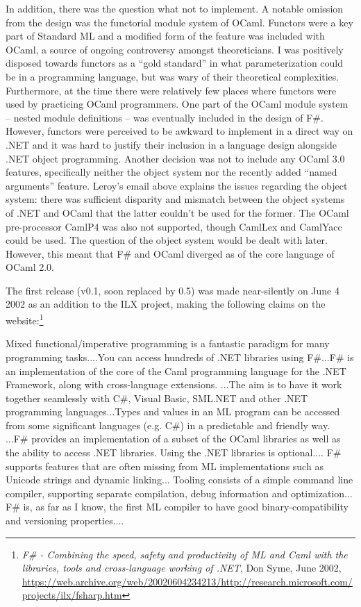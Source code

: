 \documentclass[acmsmall]{acmart}\settopmatter{}
\begin{document}
In addition, there was the question what not to implement.  A notable omission from the design was the functorial module system of OCaml.  Functors were a key part of Standard ML and a modified form of the feature was included with OCaml, a source of ongoing controversy amongst theoreticians.  I was positively disposed towards functors as a “gold standard” in what parameterization could be in a programming language, but was wary of their theoretical complexities. Furthermore, at the time there were relatively few places where functors were used by practicing OCaml programmers. One part of the OCaml module system – nested module definitions – was eventually included in the design of F\#.  However, functors were perceived to be awkward to implement in a direct way on .NET and it was hard to justify their inclusion in a language design alongside .NET object programming. Another decision was not to include any OCaml 3.0 features, specifically neither the object system nor the recently added “named arguments” feature.  Leroy’s email above explains the issues regarding the object system: there was sufficient disparity and mismatch between the object systems of .NET and OCaml that the latter couldn’t be used for the former.  The OCaml pre-processor CamlP4 was also not supported, though CamlLex and CamlYacc could be used. The question of the object system would be dealt with later.  However, this meant that F\# and OCaml diverged as of the core language of OCaml 2.0.


The first release (v0.1, soon replaced by 0.5) was made near-silently on June 4 2002 as an addition to the ILX project, making the following claims on the website:\footnote{\textit{F\# - Combining the speed, safety and productivity of ML and Caml with the libraries, tools and cross-language working of .NET}, Don Syme, June 2002, \url{https://web.archive.org/web/20020604234213/http://research.microsoft.com/projects/ilx/fsharp.htm}}
\begin{verbquote}
Mixed functional/imperative programming is a fantastic paradigm for many programming tasks....You can access hundreds of .NET libraries using F#...F# is an implementation of the core of the Caml programming language for the .NET Framework, along with cross-language extensions. ...The aim is to have it work together seamlessly with C#, Visual Basic, SML.NET and other .NET programming languages...Types and values in an ML program can be accessed from some significant languages (e.g. C#) in a predictable and friendly way. ...F# provides an implementation of a subset of the OCaml libraries as well as the ability to access .NET libraries.  Using the .NET libraries is optional.... F# supports features that are often missing from ML implementations such as Unicode strings and dynamic linking... Tooling consists of a simple command line compiler, supporting separate compilation, debug information and optimization... F# is, as far as I know, the first ML compiler to have good binary-compatibility and versioning properties....
\end{verbquote}
\end{document}
